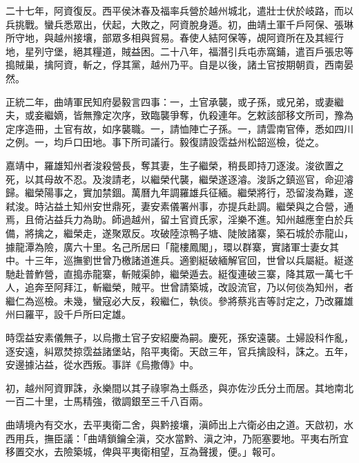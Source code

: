 \begin{pinyinscope}
二十七年，阿資復反。西平侯沐春及福率兵營於越州城北，遣壯士伏於岐路，而以兵挑戰。蠻兵悉眾出，伏起，大敗之，阿資脫身遁。初，曲靖土軍千戶阿保、張琳所守地，與越州接壤，部眾多相與貿易。春使人結阿保等，覘阿資所在及其經行地，星列守堡，絕其糧道，賊益困。二十八年，福潛引兵屯赤窩鋪，遣百戶張忠等搗賊巢，擒阿資，斬之，俘其黨，越州乃平。自是以後，諸土官按期朝貢，西南晏然。

正統二年，曲靖軍民知府晏毅言四事：一，土官承襲，或子孫，或兄弟，或妻繼夫，或妾繼嫡，皆無豫定次序，致臨襲爭奪，仇殺連年。乞敕該部移文所司，豫為定序造冊，土官有故，如序襲職。一，請恤陣亡子孫。一，請雲南官俸，悉如四川之例。一，均戶口田地。事下所司議行。毅復請設霑益州松韶巡檢，從之。

嘉靖中，羅雄知州者浚殺營長，奪其妻，生子繼榮，稍長即持刀逐浚。浚欲置之死，以其母故不忍。及浚請老，以繼榮代襲，繼榮遂逐濬。浚訴之鎮巡官，命迎濬歸。繼榮陽事之，實加禁錮。萬曆九年調羅雄兵征緬。繼榮將行，恐留浚為難，遂弒浚。時沾益土知州安世鼎死，妻安素儀署州事，亦提兵赴調。繼榮與之合營，通焉，且倚沾益兵力為助。師過越州，留土官資氏家，淫樂不進。知州越應奎白於兵備，將擒之，繼榮走，遂聚眾反。攻破陸涼鴨子塘、陡陂諸寨，築石城於赤龍山，據龍潭為險，廣六十里。名己所居曰「龍樓鳳閣」，環以群寨，實諸軍士妻女其中。十三年，巡撫劉世曾乃檄諸道進兵。適劉綎破緬解官回，世曾以兵屬綎。綎遂馳赴普鮓營，直搗赤龍寨，斬賊渠帥，繼榮遁去。綎復連破三寨，降其眾一萬七千人，追奔至阿拜江，斬繼榮，賊平。世曾請築城，改設流官，乃以何倓為知州，者繼仁為巡檢。未幾，蠻寇必大反，殺繼仁，執倓。參將蔡兆吉等討定之，乃改羅雄州曰羅平，設千戶所曰定雄。

時霑益安素儀無子，以烏撒土官子安紹慶為嗣。慶死，孫安遠襲。土婦設科作亂，逐安遠，糾眾焚掠霑益諸堡站，陷平夷衛。天啟三年，官兵擒設科，誅之。五年，安邊據沾益，從水西叛。事詳《烏撒傳》中。

初，越州阿資罪誅，永樂間以其子祿寧為土縣丞，與亦佐沙氏分土而居。其地南北一百二十里，士馬精強，徵調銀至三千八百兩。

曲靖境內有交水，去平夷衛二舍，與黔接壤，滇師出上六衛必由之道。天啟初，水西用兵，撫臣議：「曲靖鎖鑰全滇，交水當黔、滇之沖，乃阨塞要地。平夷右所宜移置交水，去險築城，俾與平夷衛相望，互為聲援，便。」報可。


\end{pinyinscope}
